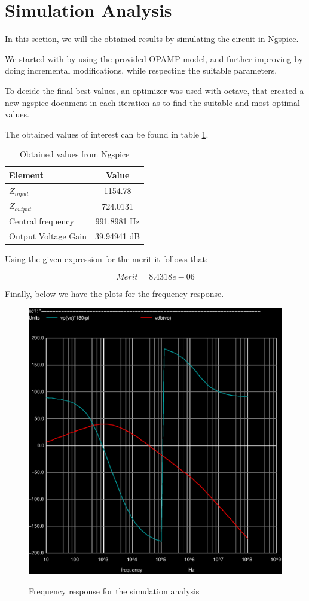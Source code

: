 \newpage

\section{Simulation Analysis}
\label{sec:simulation}

In this section, we will the obtained results by simulating the circuit in Ngspice.
 
We started with by using the provided OPAMP model, and further improving by doing incremental modifications, while respecting the suitable parameters.

To decide the final best values, an optimizer was used with octave, that created a new ngspice document in each iteration as to find the suitable and most optimal values. %

The obtained values of interest can be found in table \ref{tab:sim1}.

\begin{table}[h]
    \centering
    \begin{tabular}{|l|c|}
    \hline
    {\bf Element} & {\bf Value} \\
    \hline \hline
    $Z_{input}$ & 1154.78\\
    \hline
    $Z_{output}$ & 724.0131\\
    \hline
    Central frequency & 991.8981 Hz \\
    \hline
    Output Voltage Gain & 39.94941 dB\\
    \hline
    \end{tabular}
    \caption{Obtained values from Ngspice}
    \label{tab:sim1}
\end{table}


Using the given expression for the merit it follows that:

\begin{equation}
    Merit = 8.4318e-06
    \label{eq:merit}
\end{equation}

Finally, below we have the plots for the frequency response.

\begin{figure}[!ht] \centering
\caption{Frequency response for the simulation analysis}
\includegraphics[width=0.8\linewidth]{simulation.eps}
\label{fig:simulation}
\end{figure}



